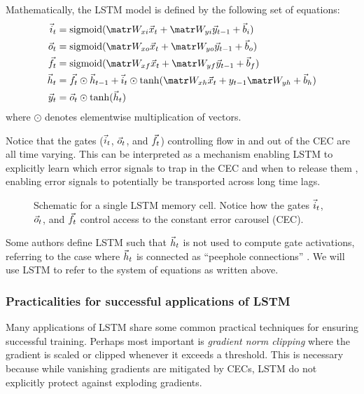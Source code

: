 Mathematically, the LSTM model is defined by the following set of equations:
\begin{align}
    \i_t &= \sigmoid(\W_{xi} \x_t + \W_{yi} \y_{t-1} + \b_i) \\
    \o_t &= \sigmoid(\W_{xo} \x_t + \W_{yo} \y_{t-1} + \b_o) \\
    \f_t &= \sigmoid(\W_{xf} \x_t + \W_{yf} \y_{t-1} + \b_f) \\
    \h_t &= \f_t \odot \h_{t-1} + \i_t \odot \tanh(\W_{xh}\x_t + y_{t-1} \W_{yh} + \b_h) \\
    \y_t &= \o_t \odot \tanh(\h_t)
\end{align}
where $\odot$ denotes elementwise multiplication of vectors.

Notice that the gates ($\vec{i}_t$, $\vec{o}_t$, and $\vec{f}_t$) controlling flow in and out
of the CEC are all time varying. This can be interpreted as a mechanism
enabling LSTM to explicitly learn which error signals to trap in the CEC and
when to release them \citep{hochreiter1997long}, enabling error signals to
potentially be transported across long time lags.

\begin{figure}[tb]
    \centering
    
    \caption{Schematic for a single LSTM memory cell. Notice how the gates $\vec{i}_t$, $\vec{o}_t$, and $\vec{f}_t$ control access to the constant error carousel (CEC).}
    \label{fig:lstm-cell}
\end{figure}

Some authors define LSTM such that $\vec{h}_t$ is not used to compute gate
activations, referring to the case where $\vec{h}_t$ is connected as ``peephole
connections'' \citep{gers2000recurrent}. We will use LSTM to refer to the
system of equations as written above.

\subsubsection{Practicalities for successful applications of LSTM}

Many applications of LSTM
\citep{devlin2014fast,zaremba2015empirical,pascanu2013construct} share some
common practical techniques for ensuring successful training. Perhaps most
important is \emph{gradient norm clipping} \citep{Mikolov2012,Pascanu2012}
where the gradient is scaled or clipped whenever it exceeds a threshold. This
is necessary because while vanishing gradients are mitigated by CECs, LSTM do
not explicitly protect against exploding gradients.

